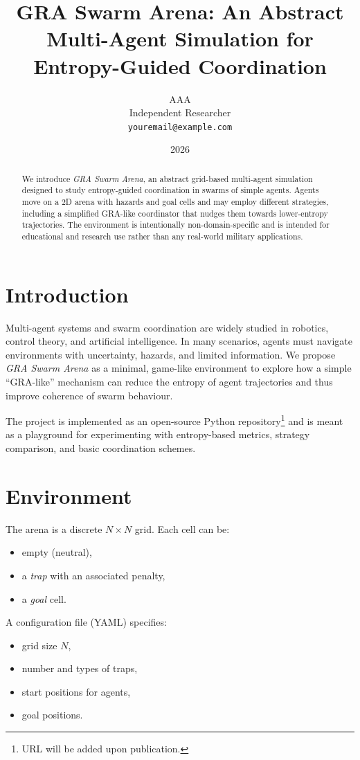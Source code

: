 \documentclass[11pt]{article}
\title{GRA Swarm Arena: An Abstract Multi-Agent Simulation for Entropy-Guided Coordination}
\author{AAA\\
\small Independent Researcher\\
\small \texttt{youremail@example.com}}
\date{2026}
\begin{document}
\maketitle

\begin{abstract}
We introduce \emph{GRA Swarm Arena}, an abstract grid-based multi-agent simulation
designed to study entropy-guided coordination in swarms of simple agents.
Agents move on a 2D arena with hazards and goal cells and may employ different
strategies, including a simplified GRA-like coordinator that nudges them
towards lower-entropy trajectories.
The environment is intentionally non-domain-specific and is intended for
educational and research use rather than any real-world military applications.
\end{abstract}

\section{Introduction}

Multi-agent systems and swarm coordination are widely studied in robotics,
control theory, and artificial intelligence.
In many scenarios, agents must navigate environments with uncertainty, hazards,
and limited information.
We propose \emph{GRA Swarm Arena} as a minimal, game-like environment to explore
how a simple ``GRA-like'' mechanism can reduce the entropy of agent trajectories
and thus improve coherence of swarm behaviour.

The project is implemented as an open-source Python repository\footnote{URL will be added upon publication.}
and is meant as a playground for experimenting with entropy-based metrics,
strategy comparison, and basic coordination schemes.

\section{Environment}

The arena is a discrete $N \times N$ grid.
Each cell can be:
\begin{itemize}
  \item empty (neutral),
  \item a \emph{trap} with an associated penalty,
  \item a \emph{goal} cell.
\end{itemize}

A configuration file (YAML) specifies:
\begin{itemize}
  \item grid size $N$,
  \item number and types of traps,
  \item start positions for agents,
  \item goal positions.
\end{itemize}
\end{document}
